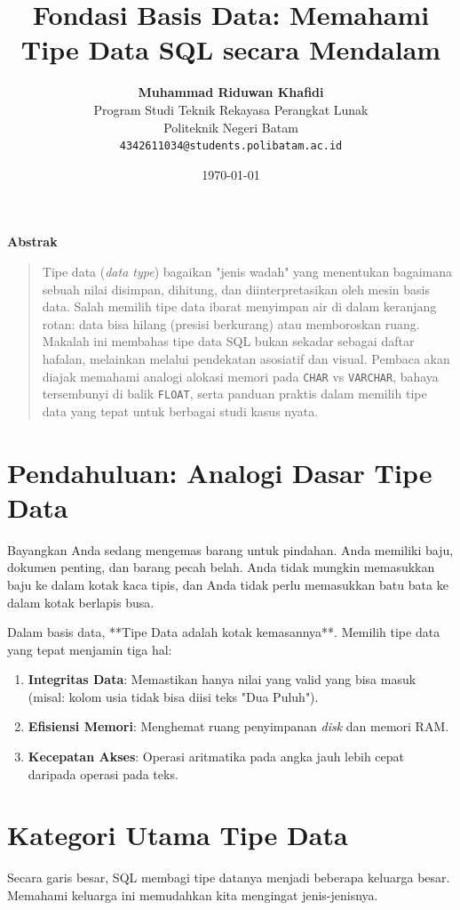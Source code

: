\documentclass[11pt,a4paper]{article}
\title{\vspace{-1.5cm}\textbf{\sffamily\LARGE Fondasi Basis Data: Memahami Tipe Data SQL secara Mendalam}}
\author{
	\textbf{Muhammad Riduwan Khafidi} \\
	\small Program Studi Teknik Rekayasa Perangkat Lunak \\
	\small Politeknik Negeri Batam \\
	\small \texttt{4342611034@students.polibatam.ac.id}
}
\date{\small\today}
\renewenvironment{abstract}
{\small
	\begin{center}\textbf{\sffamily Abstrak}\end{center}
	\begin{quote}}
	{\end{quote}}
\begin{document}
\maketitle
\thispagestyle{empty}

\begin{abstract}
	Tipe data (\textit{data type}) bagaikan "jenis wadah" yang menentukan bagaimana sebuah nilai disimpan, dihitung, dan diinterpretasikan oleh mesin basis data. Salah memilih tipe data ibarat menyimpan air di dalam keranjang rotan: data bisa hilang (presisi berkurang) atau memboroskan ruang. Makalah ini membahas tipe data SQL bukan sekadar sebagai daftar hafalan, melainkan melalui pendekatan asosiatif dan visual. Pembaca akan diajak memahami analogi alokasi memori pada \texttt{CHAR} vs \texttt{VARCHAR}, bahaya tersembunyi di balik \texttt{FLOAT}, serta panduan praktis dalam memilih tipe data yang tepat untuk berbagai studi kasus nyata.
\end{abstract}

\section{Pendahuluan: Analogi Dasar Tipe Data}

Bayangkan Anda sedang mengemas barang untuk pindahan. Anda memiliki baju, dokumen penting, dan barang pecah belah. Anda tidak mungkin memasukkan baju ke dalam kotak kaca tipis, dan Anda tidak perlu memasukkan batu bata ke dalam kotak berlapis busa.

Dalam basis data, **Tipe Data adalah kotak kemasannya**. Memilih tipe data yang tepat menjamin tiga hal:
\begin{enumerate}
	\item \textbf{Integritas Data}: Memastikan hanya nilai yang valid yang bisa masuk (misal: kolom usia tidak bisa diisi teks "Dua Puluh").
	\item \textbf{Efisiensi Memori}: Menghemat ruang penyimpanan \textit{disk} dan memori RAM.
	\item \textbf{Kecepatan Akses}: Operasi aritmatika pada angka jauh lebih cepat daripada operasi pada teks.
\end{enumerate}

\section{Kategori Utama Tipe Data}

Secara garis besar, SQL membagi tipe datanya menjadi beberapa keluarga besar. Memahami keluarga ini memudahkan kita mengingat jenis-jenisnya.
\end{document}
